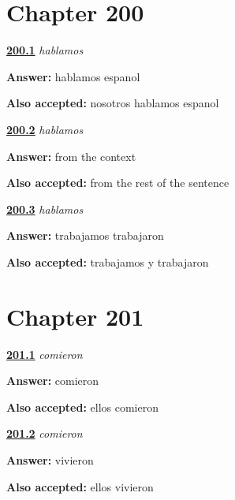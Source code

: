 \section*{Chapter 200}

\noindent\begin{minipage}[t]{\linewidth}
\raggedright
\hyperlink{review-ES-C55-hablamos-dos-say}{\textbf{200.1}} \emph{hablamos}\par
\small \textbf{Answer:} hablamos espanol\par
\footnotesize \textbf{Also accepted:} nosotros hablamos espanol
\end{minipage}\par\medskip

\noindent\begin{minipage}[t]{\linewidth}
\raggedright
\hyperlink{review-ES-C55-hablamos-dos-which}{\textbf{200.2}} \emph{hablamos}\par
\small \textbf{Answer:} from the context\par
\footnotesize \textbf{Also accepted:} from the rest of the sentence
\end{minipage}\par\medskip

\noindent\begin{minipage}[t]{\linewidth}
\raggedright
\hyperlink{review-ES-C55-hablamos-dos-pair}{\textbf{200.3}} \emph{hablamos}\par
\small \textbf{Answer:} trabajamos trabajaron\par
\footnotesize \textbf{Also accepted:} trabajamos y trabajaron
\end{minipage}\par\medskip

\section*{Chapter 201}

\noindent\begin{minipage}[t]{\linewidth}
\raggedright
\hyperlink{review-ES-C55-comieron-say}{\textbf{201.1}} \emph{comieron}\par
\small \textbf{Answer:} comieron\par
\footnotesize \textbf{Also accepted:} ellos comieron
\end{minipage}\par\medskip

\noindent\begin{minipage}[t]{\linewidth}
\raggedright
\hyperlink{review-ES-C55-comieron-vivir}{\textbf{201.2}} \emph{comieron}\par
\small \textbf{Answer:} vivieron\par
\footnotesize \textbf{Also accepted:} ellos vivieron
\end{minipage}\par\medskip

